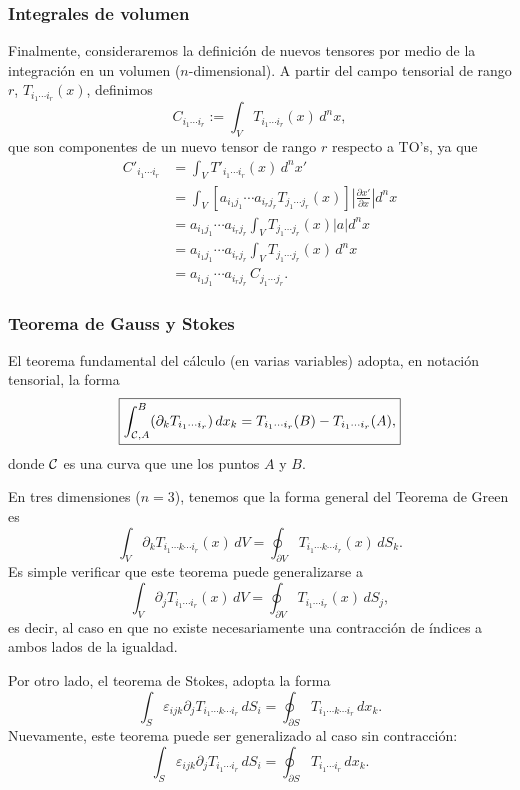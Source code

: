 \subsubsection{Integrales de volumen}
Finalmente, consideraremos la definición de nuevos tensores por medio de la integración en un volumen ($n$-dimensional). A partir del campo tensorial de rango $r$, $T_{i_1\cdots i_r}(x)$, definimos
\begin{equation}
C_{i_1\cdots i_r}:=\int_V T_{i_1\cdots i_r}(x)\,d^nx,
\end{equation}
que son componentes de un nuevo tensor de rango $r$ respecto a TO's, ya que
\begin{align}
C'_{i_1\cdots i_r} &= \int_V T'_{i_1\cdots i_r}(x)\,d^nx' \\
&= \int_V \left[a_{i_1j_1}\cdots a_{i_rj_r}T_{j_1\cdots j_r}(x)\right]\left|\frac{\partial x'}{\partial x}\right|d^nx \\
&= a_{i_1j_1}\cdots a_{i_rj_r}\int_V T_{j_1\cdots j_r}(x)\left|a\right|d^nx \\
&= a_{i_1j_1}\cdots a_{i_rj_r}\int_V T_{j_1\cdots j_r}(x)\,d^nx \\ 
&= a_{i_1j_1}\cdots a_{i_rj_r}\,C_{j_1\cdots j_r}.
\end{align} 

\subsubsection{Teorema de Gauss y Stokes}
El teorema fundamental del cálculo (en varias variables) adopta, en notación tensorial, la forma
\begin{equation}
\boxed{\int_{{\cal C},A}^B (\partial_k T_{i_1\cdots i_r})\,dx_k=T_{i_1\cdots i_r}(B)-T_{i_1\cdots i_r}(A),}
\end{equation}
donde $\cal C$ es una curva que une los puntos $A$ y $B$.

En tres dimensiones ($n=3$), tenemos que la forma general del Teorema de Green es
\begin{equation}
\int_V\partial_kT_{i_1\cdots k\cdots i_r}(x)\,dV=\oint_{\partial V}T_{i_1\cdots k\cdots i_r}(x)\,dS_k.
\end{equation}
Es simple verificar que este teorema puede generalizarse a
\begin{equation}
\boxed{\int_V\partial_jT_{i_1\cdots i_r}(x)\,dV=\oint_{\partial V}T_{i_1\cdots i_r}(x)\,dS_j,}
\end{equation}
es decir, al caso en que no existe necesariamente una contracción de índices a ambos lados de la igualdad.

Por otro lado, el teorema de Stokes, adopta la forma
\begin{equation}
\int_{S}\varepsilon_{ijk}\partial_jT_{i_1\cdots k\cdots i_r}\,dS_i 
=\oint_{\partial S}T_{i_1\cdots k\cdots i_r}\,dx_k .
\end{equation}
Nuevamente, este teorema puede ser generalizado al caso sin contracción:
\begin{equation}
\boxed{\int_{S}\varepsilon_{ijk}\partial_jT_{i_1\cdots i_r}\,dS_i 
=\oint_{\partial S}T_{i_1\cdots i_r}\,dx_k .}
\end{equation}
